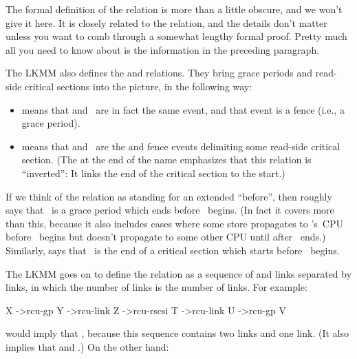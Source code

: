 The formal definition of the  relation is more than a little
obscure, and we won't give it here.
It is closely related to the  relation, and the details don't
matter unless you want to comb through a somewhat lengthy formal proof.
Pretty much all you need to know about  is the
information in the preceding paragraph.

The LKMM also defines the  and  relations.
They bring grace periods and read-side critical sections into the
picture, in the following way:

\begin{itemize}
\item	{} means that  and~ are in fact the
	same event, and that event is a  fence
	(i.e., a grace period).

\item	{} means that  and~ are the
	 and  fence events
	delimiting some read-side critical section.
	(The  at the end of the name emphasizes that this
	relation is ``inverted'':
	It links the end of the critical section to the start.)
\end{itemize}

If we think of the  relation as standing for an extended
``before'', then  roughly says that ~is a
grace period which ends before ~begins.
(In fact it covers more than this, because it also includes cases
where some store propagates to 's~CPU before ~begins
but doesn't propagate to some other CPU until after ~ends.)
Similarly,  says that ~is
the end of a critical section which starts before ~begins.

The LKMM goes on to define the  relation as a sequence of
 and  links separated by  links,
in which the number of  links is \co{>=} the number of
 links.
For example:

\begin{VerbatimU}
	X ->rcu-gp Y ->rcu-link Z ->rcu-rscsi T ->rcu-link U ->rcu-gp V
\end{VerbatimU}

\noindent%
would imply that , because this sequence contains two
 links and one  link.
(It also implies that  and .)
On the other hand:

